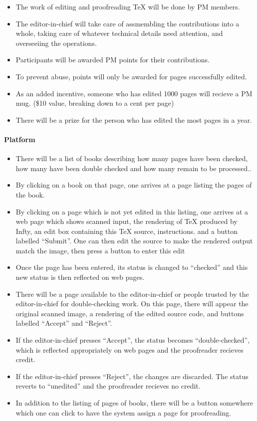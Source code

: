 \begin{itemize}
\item
  The work of editing and proofreading TeX will be done by PM members.
\item
  The editor-in-chief will take care of assmembling the contributions
  into a whole, taking care of whatever technical details need
  attention, and overseeiing the operations.
\item
  Participants will be awarded PM points for their contributions.
\item
  To prevent abuse, points will only be awarded for pages successfully
  edited.
\item
  As an added incentive, someone who has edited 1000 pages will recieve
  a PM mug. (\$10 value, breaking down to a cent per page)
\item
  There will be a prize for the person who has edited the most pages in
  a year.
\end{itemize}

\paragraph{Platform}

\begin{itemize}
\item
  There will be a list of books describing how many pages have been
  checked, how many have been double checked and how many remain to be
  processed..
\item
  By clicking on a book on that page, one arrives at a page listing the
  pages of the book.
\item
  By clicking on a page which is not yet edited in this listing, one
  arrives at a web page which shows scanned input, the rendering of TeX
  produced by Infty, an edit box containing this TeX source,
  instructions. and a button labelled ``Submit''. One can then edit the
  source to make the rendered output match the image, then press a
  button to enter this edit
\item
  Once the page has been entered, its status is changed to ``checked''
  and this new status is then reflected on web pages.
\item
  There will be a page available to the editor-in-chief or people
  trusted by the editor-in-chief for double-checking work. On this page,
  there will appear the original scanned image, a rendering of the
  edited source code, and buttons labelled ``Accept'' and ``Reject''.
\item
  If the editor-in-chief presses ``Accept'', the status becomes
  ``double-checked'', which is reflected appropriately on web pages and
  the proofreader recieves credit.
\item
  If the editor-in-chief presses ``Reject'', the changes are discarded.
  The status reverts to ``unedited'' and the proofreader recieves no
  credit.
\item
  In addition to the listing of pages of books, there will be a button
  somewhere which one can click to have the system assign a page for
  proofreading.
\end{itemize}

